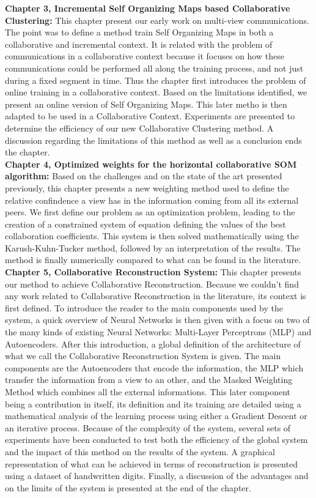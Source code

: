 \textbf{Chapter 3, Incremental Self Organizing Maps based Collaborative Clustering:} This chapter present our early work on multi-view communications. The point was to define a method train Self Organizing Maps in both a collaborative and incremental context. It is related with the problem of communications in a collaborative context because it focuses on how these communications could be performed all along the training process, and not just during a fixed segment in time. Thus the chapter first introduces the problem of online training in a collaborative context. Based on the limitations identified, we present an online version of Self Organizing Maps. This later metho is then adapted to be used in a Collaborative Context. Experiments are presented to determine the efficiency of our new Collaborative Clustering method. A discussion regarding the limitations of this method as well as a conclusion ends the chapter.\\

\textbf{Chapter 4, Optimized weights for the horizontal collaborative SOM algorithm:} Based on the challenges and on the state of the art presented previously, this chapter presents a new weighting method used to define the relative confindence a view has in the information coming from all its external peers. We first define our problem as an optimization problem, leading to the creation of a constrained system of equation defining the values of the best collaboration coefficients. This system is then solved mathematically using the Karush-Kuhn-Tucker method, followed by an interpretation of the results. The method is finally numerically compared to what can be found in the literature.\\

\textbf{Chapter 5, Collaborative Reconstruction System:} This chapter presents our method to achieve Collaborative Reconstruction. Because we couldn't find any work related to Collaborative Reconstruction in the literature, its context is first defined. To introduce the reader to the main components used by the system, a quick overview of Neural Networks is then given with a focus on two of the many kinds of existing Neural Networks: Multi-Layer Perceptrons (MLP) and Autoencoders. After this introduction, a global definition of the architecture of what we call the Collaborative Reconstruction System is given. The main components are the Autoencoders that encode the information, the MLP which transfer the information from a view to an other, and the Masked Weighting Method which combines all the external informations. This later component being a contribution in itself, its definition and its training are detailed using a mathematical analysis of the learning process using either a Gradient Descent or an iterative process. Because of the complexity of the system, several sets of experiments have been conducted to test both the efficiency of the global system and the impact of this method on the results of the system. A graphical representation of what can be achieved in terms of reconstruction is presented using a dataset of handwritten digits. Finally, a discussion of the advantages and on the limits of the system is presented at the end of the chapter.\\


